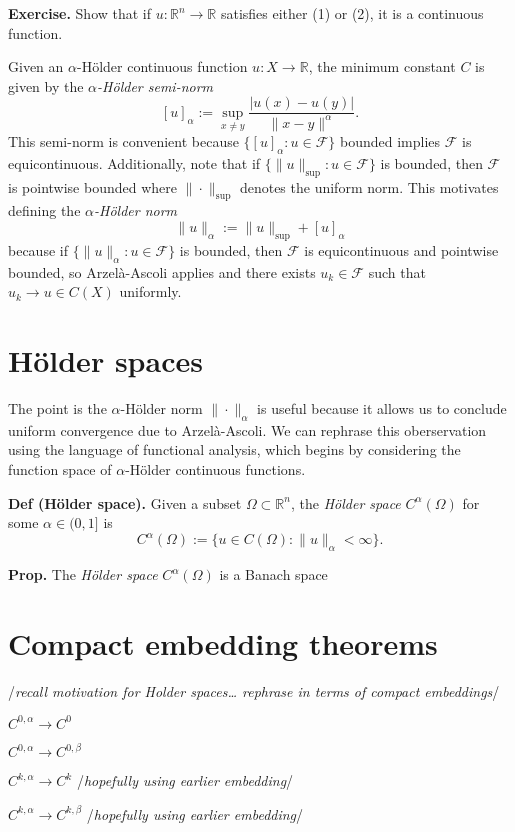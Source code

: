 \documentclass[
]{article}
\begin{document}
\textbf{Exercise.} Show that if \(u: \mathbb{R}^n \to \mathbb{R}\)
satisfies either (1) or (2), it is a continuous function.

Given an \(\alpha\)-Hölder continuous function \(u: X \to \mathbb{R}\),
the minimum constant \(C\) is given by the \emph{\(\alpha\)-Hölder
semi-norm} \[
    [u]_{\alpha} := \sup_{x \neq y}\frac{|u(x) - u(y)|}{\|x-y\|^{\alpha}}.
\] This semi-norm is convenient because
\(\{ [u]_{\alpha}: u \in \mathcal{F}\}\) bounded implies \(\mathcal{F}\)
is equicontinuous. Additionally, note that if
\(\{ \|u\|_{\sup}: u \in \mathcal{F}\}\) is bounded, then
\(\mathcal{F}\) is pointwise bounded where \(\| \cdot \|_{\sup}\)
denotes the uniform norm. This motivates defining the
\emph{\(\alpha\)-Hölder norm} \[
    \|u\|_{\alpha} := \|u\|_{\sup} + [u]_{\alpha}
\] because if \(\{\|u\|_{\alpha}: u \in \mathcal{F}\}\) is bounded, then
\(\mathcal{F}\) is equicontinuous and pointwise bounded, so
Arzelà-Ascoli applies and there exists \(u_k \in \mathcal{F}\) such that
\(u_k \to u \in C(X)\) uniformly.

\hypertarget{huxf6lder-spaces}{%
\section{Hölder spaces}\label{huxf6lder-spaces}}

The point is the \(\alpha\)-Hölder norm \(\|\cdot\|_{\alpha}\) is useful
because it allows us to conclude uniform convergence due to
Arzelà-Ascoli. We can rephrase this oberservation using the language of
functional analysis, which begins by considering the function space of
\(\alpha\)-Hölder continuous functions.

\textbf{Def (Hölder space).} Given a subset
\(\Omega \subset \mathbb{R}^n\), the \emph{Hölder space}
\(C^{\alpha}(\Omega)\) for some \(\alpha \in (0,1]\) is \[
    C^{\alpha}(\Omega) := \{u \in C(\Omega) : \|u\|_{\alpha} < \infty\}.
\]

\textbf{Prop.} The \emph{Hölder space} \(C^{\alpha}(\Omega)\) is a
Banach space

\hypertarget{compact-embedding-theorems}{%
\section{Compact embedding theorems}\label{compact-embedding-theorems}}

/\emph{recall motivation for Holder spaces\ldots{} rephrase in terms of
compact embeddings}/

\(C^{0, \alpha} \to C^0\)

\(C^{0, \alpha} \to C^{0, \beta}\)

\(C^{k, \alpha} \to C^{k}\) /\emph{hopefully using earlier embedding}/

\(C^{k, \alpha} \to C^{k, \beta}\) /\emph{hopefully using earlier
embedding}/
\end{document}
